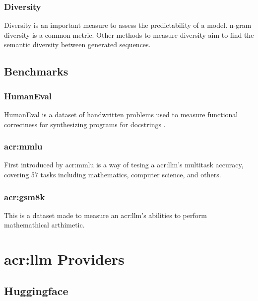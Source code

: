 \subsubsection{Diversity}

Diversity is an important measure to assess the predictability of a model. n-gram diversity is a common metric. Other methods to measure diversity aim to find the semantic diversity between generated sequences.

\subsection{Benchmarks}\label{subsec:benchmarks}

\subsubsection{HumanEval}\label{subsubsec:humaneval}

HumanEval is a dataset of handwritten problems used to measure functional correctness for synthesizing programs for docstrings \citep[2-4]{chenEvaluatingLargeLanguage2021}.

\subsubsection[Multitask Language Understanding]{\acrlong{acr:mmlu}}

First introduced by \cite{hendrycksMeasuringMassiveMultitask2021} \acrlong{acr:mmlu} is a way of tesing a \acrlong{acr:llm}'s multitask accuracy, covering 57 tasks including mathematics, computer science, and others.

\subsubsection[Grade School Math 8K]{\acrlong{acr:gsm8k}}

This is a dataset made to measure an \acrshort{acr:llm}'s abilities to perform mathemathical arthimetic.


\section[LLM providers]{\acrfull{acr:llm} Providers}\label{sec:llm-providers}


\subsection{Huggingface}\label{subsec:hugginface}

